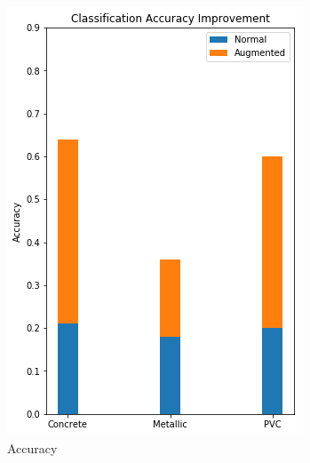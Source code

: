 \begin{figure}[H]
  \centering
  \begin{subfigure}[b]{0.4\linewidth}
    \includegraphics[width=\linewidth]{figures/Frequency-Accuracy.png}
    \caption{Accuracy}
  \end{subfigure}
  \begin{subfigure}[b]{0.4\linewidth}

\end{subfigure}
\end{figure}
